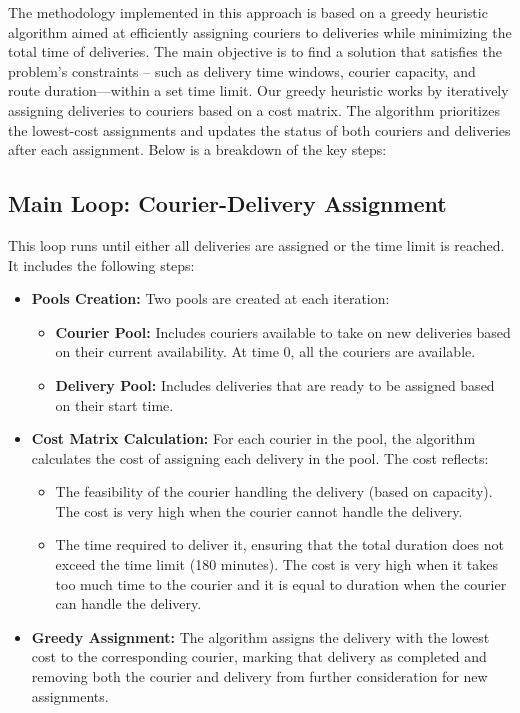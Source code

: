\documentclass[a4paper]{article}
\begin{document}
%
The methodology implemented in this approach is based on a greedy heuristic algorithm aimed at efficiently assigning couriers to deliveries while minimizing the total time of deliveries. The main objective is to find a solution that satisfies the problem's constraints -- such as delivery time windows, courier capacity, and route duration—within a set time limit.
Our greedy heuristic works by iteratively assigning deliveries to couriers based on a cost matrix. The algorithm prioritizes the lowest-cost assignments and updates the status of both couriers and deliveries after each assignment. Below is a breakdown of the key steps:

\subsection{Main Loop: Courier-Delivery Assignment}
This loop runs until either all deliveries are assigned or the time limit is reached. It includes the following steps:
\begin{itemize}
    \item \textbf{Pools Creation:} Two pools are created at each iteration:
    \begin{itemize}
        \item \textbf{Courier Pool:} Includes couriers available to take on new deliveries based on their current availability. At time 0, all the couriers are available.
        \item \textbf{Delivery Pool:} Includes deliveries that are ready to be assigned based on their start time.
    \end{itemize}
    \item \textbf{Cost Matrix Calculation:} For each courier in the pool, the algorithm calculates the cost of assigning each delivery in the pool. The cost reflects:
    \begin{itemize}
        \item The feasibility of the courier handling the delivery (based on capacity). The cost is very high when the courier cannot handle the delivery.
        \item The time required to deliver it, ensuring that the total duration does not exceed the time limit (180 minutes). The cost is very high when it takes too much time to the courier and it is equal to duration when the courier can handle the delivery.
    \end{itemize}
    \item \textbf{Greedy Assignment:} The algorithm assigns the delivery with the lowest cost to the corresponding courier, marking that delivery as completed and removing both the courier and delivery from further consideration for new assignments.
\end{itemize}
\end{document}
